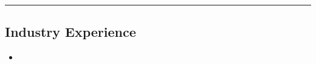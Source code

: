 \hrule
\vspace{-1em}
\subsection*{Industry Experience}
\begin{itemize}[label={},leftmargin=1em]
\parskip=0.1em

    \item 

\end{itemize}
